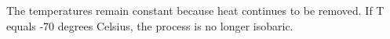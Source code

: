 The temperatures remain constant because heat continues to be removed. If T equals -70 degrees Celsius, the process is no longer isobaric.